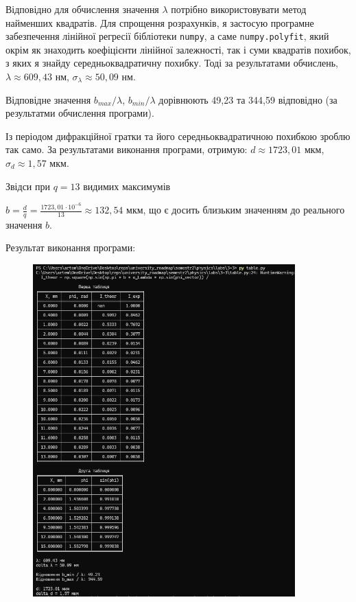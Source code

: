 \documentclass[12pt,a4paper]{article}
\begin{document}
    Відповідно для обчислення значення $\lambda$ потрібно використовувати метод найменших квадратів. Для спрощення розрахунків, я застосую
    програмне забезпечення лінійної регресії бібліотеки \texttt{numpy}, а саме \texttt{numpy.polyfit}, який окрім як знаходить коефіцієнти лінійної залежності, так і 
    суми квадратів похибок, з яких я знайду середньоквадратичну похибку.
    Тоді за результатами обчислень, $\lambda \approx 609{,}43$ нм, $\sigma_{\lambda} \approx 50{,}09$ нм.

    Відповідне значення $b_{max}\slash \lambda$, $b_{min} \slash \lambda$ дорівнюють 49{,}23 та 344{,}59 відповідно (за результатми обчислення програми).

    Із періодом дифракційної гратки та його середньоквадратичною похибкою зроблю так само. За результатами виконання програми, отримую:
    $d \approx 1723{,}01$ мкм, $\sigma_d \approx 1{,}57$ мкм.

    Звідси при $q = 13$ видимих максимумів

    \vspace{5pt}
    
    $\displaystyle b = \frac{d}{q} = \frac{1723{,}01 \cdot 10^{-6}}{13} \approx 132{,}54$ мкм, що є досить близьким значенням до реального значення $b$.

    \newpage

    \setlength{\parindent}{0pt}

    Результат виконання програми:

    \begin{figure}[ht]
        \includegraphics[width=0.9\textwidth]{programm_running.png}
    \end{figure}
\end{document}
